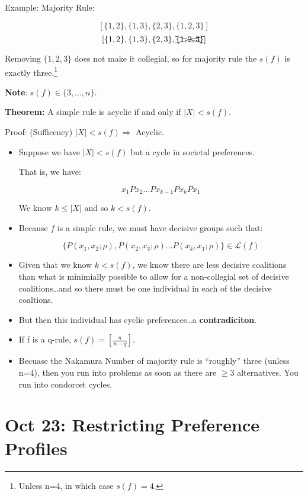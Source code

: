 \documentclass{article}
\newcommand{\Lm}{\mathcal{L}}
\begin{document}
Example: Majority Rule:

\[
[\{1,2\}, \{1,3\}, \{2,3\}, \{1,2,3\}]
\]
\[
[\{1,2\}, \{1,3\}, \{2,3\}, \xcancel{\{1,2,3\}}] 
\]

Removing $\{1,2,3\}$ does not make it collegial, so for majority rule the $s(f)$ is exactly three.\footnote{Unless n=4, in which case $s(f)=4$.}

\textbf{Note}: $s(f) \in \{3,\dots,n\}$.

\bigskip

\textbf{Theorem:} A simple rule is acyclic if and only if $|X| < s(f)$.

Proof: (Sufficency)
$|X| < s(f) \Rightarrow$ Acyclic.

\begin{itemize}

\item Suppose we have $|X| < s(f)$ but a cycle in societal preferences.

That is, we have:

\[
x_1 P x_2 \dots Px_{k-1}Px_kPx_1
\] 

We know $k \leq |X|$ and so $k<s(f)$.


\item Because $f$ is a simple rule, we must have decisive groups such that:

\[
\{ P(x_1,x_2; \rho), P(x_2,x_3; \rho) \dots P(x_k,x_1;\rho) \} \in \Lm(f)
\]


\item Given that we know $k < s(f)$, we know there are less decisive coalitions than what is minimially possible to allow for a non-collegial set of decisive coalitions\dots and so there must be one individual in each of the decisive coaltions. 
\item But then this individual has cyclic preferences\dots a \textbf{contradiciton}.
\end{itemize}

\begin{itemize}

\item If f is a q-rule, $s(f) = \left[\frac n {n-q}\right]$.

\item Becuase the Nakamura Number of majority rule is ``roughly'' three (unless n=4), then you run into problems as soon as there are $\geq 3$ alternatives. You run into condorcet cycles.
\end{itemize}

\section*{ Oct 23: Restricting Preference Profiles}
\end{document}

